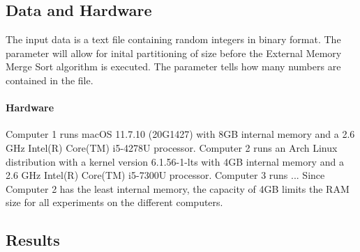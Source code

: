 \documentclass[twocolumn]{article}
\begin{document}
\subsection{Data and Hardware}
\label{sub:Data and Hardware}

The input data is a text file containing random integers in binary format.
The parameter  will allow for inital partitioning of size  before the External Memory Merge Sort algorithm is executed.
The  parameter tells how many numbers are contained in the file.

\paragraph{Hardware}
Computer 1 runs macOS 11.7.10 (20G1427) with 8GB internal memory and a 2.6 GHz Intel(R) Core(TM) i5-4278U processor.
Computer 2 runs an Arch Linux distribution with a kernel version 6.1.56-1-lts with 4GB internal memory and a 2.6 GHz Intel(R) Core(TM) i5-7300U  processor.
Computer 3 runs ...  %
Since Computer 2 has the least internal memory, the capacity of 4GB limits the RAM size for all experiments on the different computers.

\subsection{Results}
\label{sub:Results}
\end{document}
